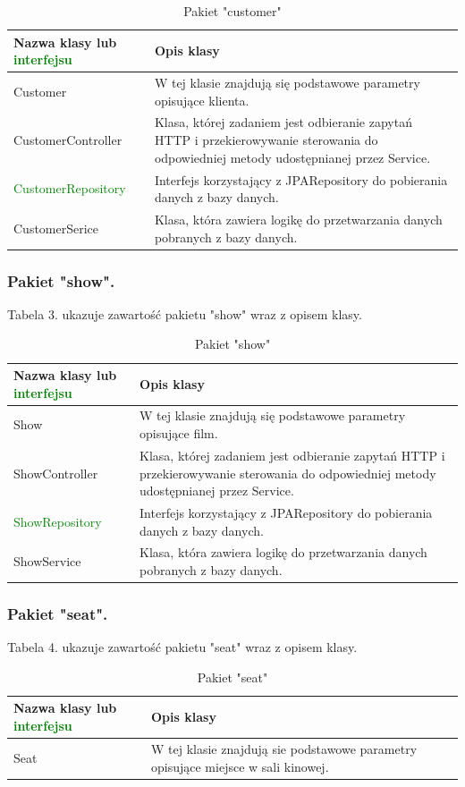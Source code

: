 \documentclass[a4paper,12pt]{article}
\begin{document}
\begin{table}[H]
\centering
\begin{tabular}{ |p{4.0cm}|p{6.0cm}|  }				

\hline
\textbf{Nazwa klasy lub \textcolor{green}{interfejsu}} & \textbf{Opis klasy}   \\
\hline
Customer & W tej klasie znajdują się podstawowe parametry opisujące klienta. \\
\hline
CustomerController & Klasa, której zadaniem jest odbieranie zapytań HTTP i przekierowywanie sterowania do odpowiedniej metody udostępnianej przez Service. \\
\hline
\textcolor{green}{CustomerRepository} & Interfejs korzystający z JPARepository do pobierania danych z bazy danych.\\
\hline
CustomerSerice & Klasa, która zawiera logikę do przetwarzania danych pobranych z bazy danych.\\
\hline
\end{tabular}
\caption{Pakiet "customer"}
\end{table}

\subsubsection{Pakiet "show".}
Tabela 3. ukazuje zawartość pakietu "show" wraz z opisem klasy.
\begin{table}[H]
\centering
\begin{tabular}{ |p{4.0cm}|p{6.0cm}|  }				
\hline
\textbf{Nazwa klasy lub \textcolor{green}{interfejsu}} & \textbf{Opis klasy}   \\
\hline
Show & W tej klasie znajdują się podstawowe parametry opisujące film. \\
\hline
ShowController & Klasa, której zadaniem jest odbieranie zapytań HTTP i przekierowywanie sterowania do odpowiedniej metody udostępnianej przez Service. \\
\hline
\textcolor{green}{ShowRepository} & Interfejs korzystający z JPARepository do pobierania danych z bazy danych.\\
\hline
ShowService & Klasa, która zawiera logikę do przetwarzania danych pobranych z bazy danych.\\
\hline
\end{tabular}
\caption{Pakiet "show"}
\end{table}

\subsubsection{Pakiet "seat".}
Tabela 4. ukazuje zawartość pakietu "seat" wraz z opisem klasy.
\begin{table}[H]
\centering
\begin{tabular}{ |p{6.0cm}|p{6.0cm}|  }			
\hline
\textbf{Nazwa klasy lub \textcolor{green}{interfejsu}} & \textbf{Opis klasy}   \\
\hline
Seat & W tej klasie znajdują sie podstawowe parametry opisujące miejsce w sali kinowej. \\
\hline
\end{tabular}
\caption{Pakiet "seat"}
\end{table}
\end{document}
